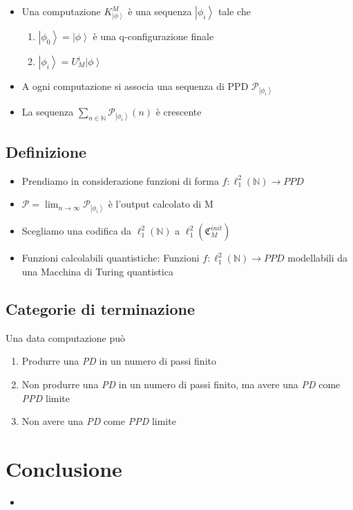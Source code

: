 \documentclass{beamer}
\newcommand{\ket}[1]{\left | #1 \right \rangle}
\newcommand{\conf}{\mathfrak{C}_{M}}
\newcommand{\hil}{\ell^{2}}
\newcommand{\hiluninorm}{\hil_{1}}
\begin{document}
\begin{frame}{\secname}{\subsecname}
	\begin{itemize}
		\item<+-> Una \alert{computazione} \(K^{M}_{\ket{\phi}}\) è una sequenza \(\ket{\phi_{i}}\) tale che
		\begin{enumerate}
			\item \(\ket{\phi_{0}} = \ket{\phi}\) è una q-configurazione finale
			\item \(\ket{\phi_{i}} = U_{M}^{i}\ket{\phi}\)
		\end{enumerate}
		\item<+-> A ogni computazione si associa una sequenza di PPD \( \mathcal{P}_{\ket{\phi_{i}}} \)
		\item<+-> La sequenza \(\sum_{n \in \mathbb{N}} \mathcal{P}_{\ket{\phi_{i}}} \left ( n \right )\) è crescente
	\end{itemize}
\end{frame}

\subsection{Definizione}

\begin{frame}{\secname}{\subsecname}
	\begin{itemize}
		\item<1-> Prendiamo in considerazione funzioni di forma \( f : \hiluninorm \left ( \mathbb{N} \right ) \rightarrow PPD \)
		\item<2-> \( \mathcal{P} = \lim_{n \to \infty} \mathcal{P}_{\ket{\phi_{i}}} \) è l'\alert{output calcolato} di M
		\item<2-> Scegliamo una codifica da \( \hiluninorm \left ( \mathbb{N} \right ) \) a \( \hiluninorm \left ( \conf^{init} \right ) \)
		\item<3-> \alert{Funzioni calcolabili quantistiche}: Funzioni \( f : \hiluninorm \left ( \mathbb{N} \right ) \rightarrow PPD \) modellabili da una Macchina di Turing quantistica
	\end{itemize}
\end{frame}

\subsection{Categorie di terminazione}

\begin{frame}{\subsecname}{}
	Una data computazione può
	\begin{enumerate}
		\item<+-> Produrre una \textit{PD} in un numero di passi finito
		\item<+-> Non produrre una \textit{PD} in un numero di passi finito, ma avere una \textit{PD} come \textit{PPD} limite
		\item<+-> Non avere una \textit{PD} come \textit{PPD} limite
	\end{enumerate}
\end{frame}

\section{Conclusione}

\begin{frame}{\secname}{}
	\begin{itemize}
		\item
	\end{itemize}
\end{frame}
\end{document}
